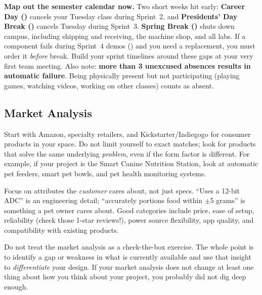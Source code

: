 \begin{protip}
\textbf{Map out the semester calendar now.} Two short weeks hit early: \textbf{Career Day (\careerday)} cancels your Tuesday class during Sprint~2, and \textbf{Presidents' Day Break (\presidentsday)} cancels Tuesday during Sprint~3. \textbf{Spring Break (\springbreakdates)} shuts down campus, including shipping and receiving, the machine shop, and all labs. If a component fails during Sprint~4 demos (\sprintfourdemos) and you need a replacement, you must order it \textit{before} break. Build your sprint timelines around these gaps at your very first team meeting. Also note: \textbf{more than 3 unexcused absences results in automatic failure}. Being physically present but not participating (playing games, watching videos, working on other classes) counts as absent.
\end{protip}

\subsection{Market Analysis}

\begin{faqbox}
Start with Amazon, specialty retailers, and Kickstarter/Indiegogo for consumer products in your space. Do not limit yourself to exact matches; look for products that solve the same underlying \textit{problem}, even if the form factor is different. For example, if your project is the Smart Canine Nutrition Station, look at automatic pet feeders, smart pet bowls, and pet health monitoring systems.
\end{faqbox}

\begin{faqbox}
Focus on attributes the \textit{customer} cares about, not just specs. ``Uses a 12-bit ADC'' is an engineering detail; ``accurately portions food within $\pm$5 grams'' is something a pet owner cares about. Good categories include price, ease of setup, reliability (check those 1-star reviews!), power source flexibility, app quality, and compatibility with existing products.
\end{faqbox}

\begin{warnbox}
Do not treat the market analysis as a check-the-box exercise. The whole point is to identify a gap or weakness in what is currently available and use that insight to \textit{differentiate} your design. If your market analysis does not change at least one thing about how you think about your project, you probably did not dig deep enough.
\end{warnbox}

